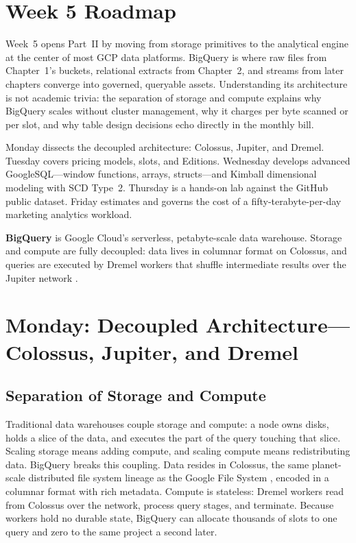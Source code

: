 \section{Week 5 Roadmap}
Week~5 opens Part~II by moving from storage primitives to the analytical engine at the center of most GCP data platforms. BigQuery is where raw files from Chapter~1's buckets, relational extracts from Chapter~2, and streams from later chapters converge into governed, queryable assets. Understanding its architecture is not academic trivia: the separation of storage and compute explains why BigQuery scales without cluster management, why it charges per byte scanned or per slot, and why table design decisions echo directly in the monthly bill.

Monday dissects the decoupled architecture: Colossus, Jupiter, and Dremel. Tuesday covers pricing models, slots, and Editions. Wednesday develops advanced GoogleSQL---window functions, arrays, structs---and Kimball dimensional modeling with SCD Type~2. Thursday is a hands-on lab against the GitHub public dataset. Friday estimates and governs the cost of a fifty-terabyte-per-day marketing analytics workload.

\begin{definitionbox}
\textbf{BigQuery} is Google Cloud's serverless, petabyte-scale data warehouse. Storage and compute are fully decoupled: data lives in columnar format on Colossus, and queries are executed by Dremel workers that shuffle intermediate results over the Jupiter network \cite{googlecloudbigquerydocs,melnik2010dremel}.
\end{definitionbox}

\section{Monday: Decoupled Architecture---Colossus, Jupiter, and Dremel}

\subsection{Separation of Storage and Compute}
Traditional data warehouses couple storage and compute: a node owns disks, holds a slice of the data, and executes the part of the query touching that slice. Scaling storage means adding compute, and scaling compute means redistributing data. BigQuery breaks this coupling. Data resides in Colossus, the same planet-scale distributed file system lineage as the Google File System \cite{ghemawat2003gfs}, encoded in a columnar format with rich metadata. Compute is stateless: Dremel workers read from Colossus over the network, process query stages, and terminate. Because workers hold no durable state, BigQuery can allocate thousands of slots to one query and zero to the same project a second later.

